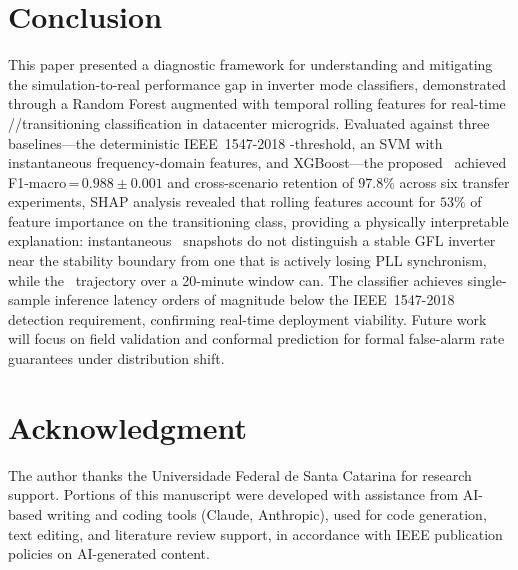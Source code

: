 \documentclass[journal]{IEEEtran}
\newcommand{\rocof}{\text{RoCoF}}
\newcommand{\gfl}{\text{GFL}}
\newcommand{\gfm}{\text{GFM}}
\newcommand{\rf}{\text{RF}}
\begin{document}
\section{Conclusion}
\label{sec:conclusion}

This paper presented a diagnostic framework for understanding and
mitigating the simulation-to-real performance gap in inverter mode
classifiers, demonstrated through a Random Forest augmented with temporal
rolling features for real-time \gfl/\gfm/transitioning classification
in datacenter microgrids.
Evaluated against three baselines---the deterministic IEEE~1547-2018
\rocof-threshold, an SVM with instantaneous frequency-domain features,
and XGBoost---the proposed \rf\ achieved F1-macro\,=\,$0.988 \pm 0.001$ and
cross-scenario retention of $97.8\%$ across six transfer experiments,
SHAP analysis revealed that rolling features account for $53\%$ of
feature importance on the transitioning class, providing a physically
interpretable explanation: instantaneous \rocof\ snapshots do not
distinguish a stable GFL inverter near the stability boundary
from one that is actively losing PLL synchronism, while the \rocof\
trajectory over a 20-minute window can.
The classifier achieves single-sample inference latency orders of
magnitude below the IEEE~1547-2018 detection requirement, confirming
real-time deployment viability.
Future work will focus on field validation and conformal prediction
for formal false-alarm rate guarantees under distribution shift.

\section*{Acknowledgment}
The author thanks the Universidade Federal de Santa Catarina
for research support.
Portions of this manuscript were developed with assistance from
AI-based writing and coding tools (Claude, Anthropic), used
for code generation, text editing, and literature review support,
in accordance with IEEE publication policies on AI-generated content.
\end{document}
